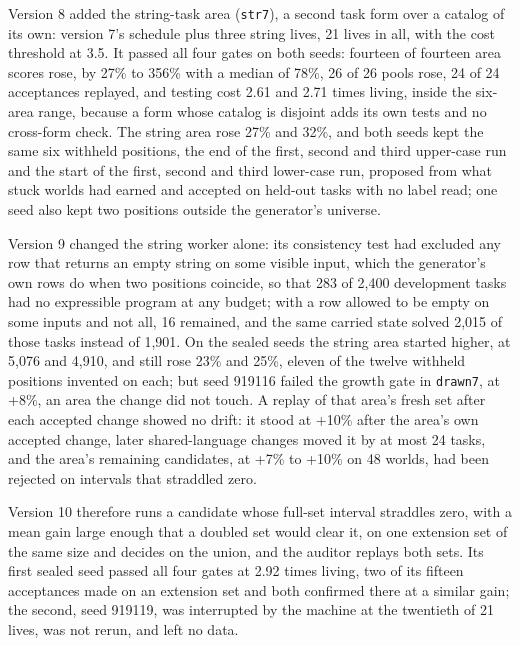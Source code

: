 \documentclass[11pt]{article}
\begin{document}
Version 8 added the string-task area (\texttt{str7}), a second task form over a catalog of its own: version 7's schedule plus three string lives, 21 lives in all, with the cost threshold at 3.5. It passed all four gates on both seeds: fourteen of fourteen area scores rose, by 27\% to 356\% with a median of 78\%, 26 of 26 pools rose, 24 of 24 acceptances replayed, and testing cost 2.61 and 2.71 times living, inside the six-area range, because a form whose catalog is disjoint adds its own tests and no cross-form check. The string area rose 27\% and 32\%, and both seeds kept the same six withheld positions, the end of the first, second and third upper-case run and the start of the first, second and third lower-case run, proposed from what stuck worlds had earned and accepted on held-out tasks with no label read; one seed also kept two positions outside the generator's universe.

Version 9 changed the string worker alone: its consistency test had excluded any row that returns an empty string on some visible input, which the generator's own rows do when two positions coincide, so that 283 of 2,400 development tasks had no expressible program at any budget; with a row allowed to be empty on some inputs and not all, 16 remained, and the same carried state solved 2,015 of those tasks instead of 1,901. On the sealed seeds the string area started higher, at 5,076 and 4,910, and still rose 23\% and 25\%, eleven of the twelve withheld positions invented on each; but seed 919116 failed the growth gate in \texttt{drawn7}, at +8\%, an area the change did not touch. A replay of that area's fresh set after each accepted change showed no drift: it stood at +10\% after the area's own accepted change, later shared-language changes moved it by at most 24 tasks, and the area's remaining candidates, at +7\% to +10\% on 48 worlds, had been rejected on intervals that straddled zero.

Version 10 therefore runs a candidate whose full-set interval straddles zero, with a mean gain large enough that a doubled set would clear it, on one extension set of the same size and decides on the union, and the auditor replays both sets. Its first sealed seed passed all four gates at 2.92 times living, two of its fifteen acceptances made on an extension set and both confirmed there at a similar gain; the second, seed 919119, was interrupted by the machine at the twentieth of 21 lives, was not rerun, and left no data.
\end{document}
